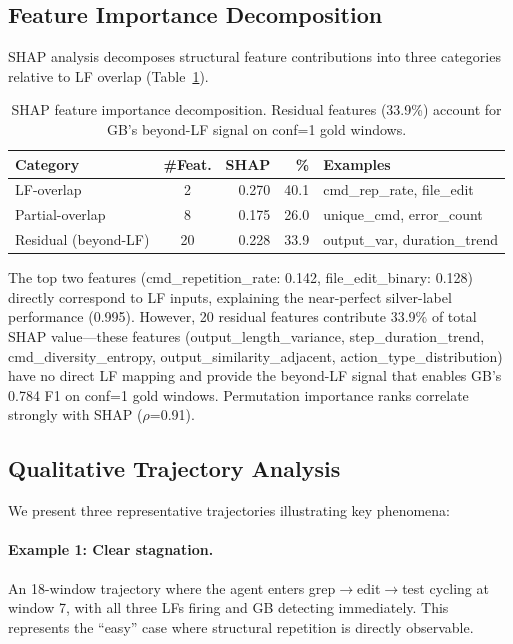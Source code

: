 \documentclass[11pt,a4paper]{article}
\begin{document}
\subsection{Feature Importance Decomposition}
\label{sec:shap}

SHAP analysis decomposes structural feature contributions into three categories relative to LF overlap (Table~\ref{tab:shap}).

\begin{table}[t]
\centering
\small
\begin{tabular}{lcrrl}
\toprule
\textbf{Category} & \textbf{\#Feat.} & \textbf{SHAP} & \textbf{\%} & \textbf{Examples} \\
\midrule
LF-overlap & 2 & 0.270 & 40.1 & cmd\_rep\_rate, file\_edit \\
Partial-overlap & 8 & 0.175 & 26.0 & unique\_cmd, error\_count \\
Residual (beyond-LF) & 20 & 0.228 & 33.9 & output\_var, duration\_trend \\
\bottomrule
\end{tabular}
\caption{SHAP feature importance decomposition. Residual features (33.9\%) account for GB's beyond-LF signal on conf=1 gold windows.}
\label{tab:shap}
\end{table}

The top two features (cmd\_repetition\_rate: 0.142, file\_edit\_binary: 0.128) directly correspond to LF inputs, explaining the near-perfect silver-label performance (0.995).
However, 20 residual features contribute 33.9\% of total SHAP value---these features (output\_length\_variance, step\_duration\_trend, cmd\_diversity\_entropy, output\_similarity\_adjacent, action\_type\_distribution) have no direct LF mapping and provide the beyond-LF signal that enables GB's 0.784 F1 on conf=1 gold windows.
Permutation importance ranks correlate strongly with SHAP ($\rho$=0.91).

\subsection{Qualitative Trajectory Analysis}

We present three representative trajectories illustrating key phenomena:

\paragraph{Example 1: Clear stagnation.}
An 18-window trajectory where the agent enters grep$\to$edit$\to$test cycling at window 7, with all three LFs firing and GB detecting immediately.
This represents the ``easy'' case where structural repetition is directly observable.
\end{document}
